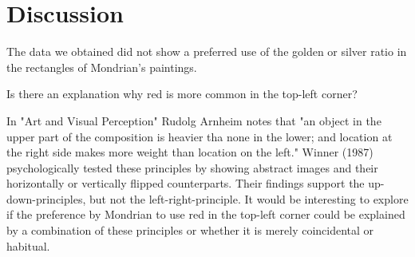 \section{Discussion} \label{conclusion}




The data we obtained did not show a preferred use of the golden or silver ratio
in the rectangles of Mondrian's paintings.





Is there an explanation why red is more common in the top-left corner?

In "Art and Visual Perception" Rudolg Arnheim \cite{Arnheim1965} notes that "an
object in the upper part of the composition is heavier tha none in the lower;
and location at the right side makes more weight than location on the left."
Winner (1987) \cite{Winner1987} psychologically tested these principles by
showing abstract images and their horizontally or vertically flipped
counterparts. Their findings support the up-down-principles, but not the
left-right-principle.
It would be interesting to explore if the preference by Mondrian to use red
in the top-left corner could be explained by a combination of these principles
or whether it is merely coincidental or habitual.
